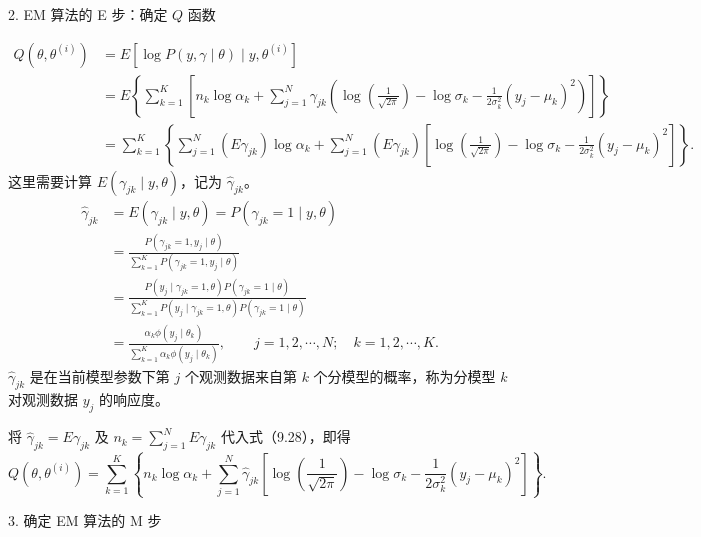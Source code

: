 \documentclass[UTF8, 12pt, fontset=fandol, oneside]{ctexart}
\begin{document}
2. EM 算法的 E 步：确定 $Q$ 函数

\begin{equation}
\begin{aligned}
  Q(\theta,\theta^{(i)})
  &=E[\log P(y,\gamma\mid\theta)\mid y,\theta^{(i)}]\\
  &=E\left\{\sum_{k=1}^K\left[
  n_k\log\alpha_k+\sum_{j=1}^N\gamma_{jk}
  \left(\log\left(\frac1{\sqrt{2\pi}}\right)-\log\sigma_k
  -\frac1{2\sigma_k^2}(y_j-\mu_k)^2\right)\right]\right\}\\
  &=\sum_{k=1}^K\left\{
  \sum_{j=1}^N(E\gamma_{jk})\log\alpha_k+
  \sum_{j=1}^N(E\gamma_{jk})
  \left[\log\left(\frac1{\sqrt{2\pi}}\right)-\log\sigma_k
  -\frac1{2\sigma_k^2}(y_j-\mu_k)^2\right]\right\}.
\end{aligned}
  \tag{9.28}
\end{equation}
这里需要计算 $E(\gamma_{jk}\mid y,\theta)$，记为 $\hat{\gamma}_{jk}$。
\[
\begin{aligned}
  \hat{\gamma}_{jk}
  &=E(\gamma_{jk}\mid y,\theta)=P(\gamma_{jk}=1\mid y,\theta)\\
  &=\frac{P(\gamma_{jk}=1,y_j\mid\theta)}
  {\sum_{k=1}^K P(\gamma_{jk}=1,y_j\mid\theta)}\\
  &=\frac{P(y_j\mid\gamma_{jk}=1,\theta)P(\gamma_{jk}=1\mid\theta)}
  {\sum_{k=1}^K P(y_j\mid\gamma_{jk}=1,\theta)P(\gamma_{jk}=1\mid\theta)}\\
  &=\frac{\alpha_k\phi(y_j\mid\theta_k)}
  {\sum_{k=1}^K\alpha_k\phi(y_j\mid\theta_k)},
  \qquad j=1,2,\cdots,N;\quad k=1,2,\cdots,K.
\end{aligned}
\]
$\hat{\gamma}_{jk}$ 是在当前模型参数下第 $j$ 个观测数据来自第 $k$ 个分模型的概率，称为分模型 $k$ 对观测数据 $y_j$ 的响应度。

将 $\hat{\gamma}_{jk}=E\gamma_{jk}$ 及 $n_k=\sum_{j=1}^N E\gamma_{jk}$ 代入式（9.28），即得
\begin{equation}
  Q(\theta,\theta^{(i)})
  =\sum_{k=1}^K\left\{
  n_k\log\alpha_k+\sum_{j=1}^N\hat{\gamma}_{jk}
  \left[\log\left(\frac1{\sqrt{2\pi}}\right)-\log\sigma_k
  -\frac1{2\sigma_k^2}(y_j-\mu_k)^2\right]\right\}.
  \tag{9.29}
\end{equation}

3. 确定 EM 算法的 M 步
\end{document}

